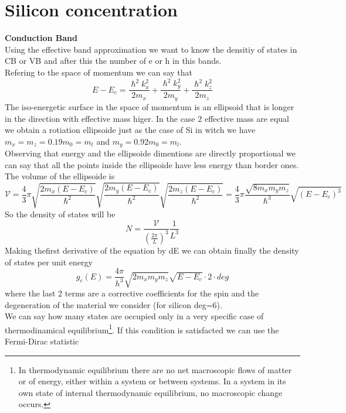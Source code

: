 \section{Silicon concentration}
{\bf Conduction Band}\\
Using the effective band approximation we want to know the densitiy of states in CB or VB and after this the number of e or h in this bands.\\
Refering to the space of momentum we can say that
\begin{equation}
E-E_c=\frac{\hslash^2 k_x^2}{2m_x}+\frac{\hslash^2 k_y^2}{2m_y}+\frac{\hslash^2 k_z^2}{2m_z}
\end{equation}
The iso-energetic surface in the space of momentum is an ellipsoid that is longer in the direction with effective mass higer. In the case 2 effective mass are equal we obtain a rotiation ellipsoide just as the case of Si in witch we have $m_x=m_z=0.19m_0=m_t$ and $m_y=0.92m_0=m_l$.\\
Observing that energy and the ellipsoide dimentions are directly proportional we can say that all the points inside the ellipsoide have less energy than border ones.\\
The volume of the ellipsoide is 
\begin{equation}
\mathcal{V}=\frac{4}{3}\pi \sqrt{\frac{2m_x(E-E_c)}{\hslash^2}}\sqrt{\frac{2m_y(E-E_c)}{\hslash^2}}\sqrt{\frac{2m_z(E-E_c)}{\hslash^2}}=\frac{4}{3}\pi\frac{\sqrt{8m_xm_ym_z}}{\hslash^3}\sqrt{(E-E_c)^3}
\end{equation}
So the density of states will be 
\begin{equation}
N=\frac{\mathcal{V}}{(\frac{2\pi}{L})^3}\frac{1}{L^3}
\end{equation}
Making thefirst derivative of the equation by dE we can obtain finally the density of states per unit energy
\begin{equation}
g_c(E)=\frac{4\pi}{h^3}\sqrt{2m_xm_ym_z}\sqrt{E-E_c}\cdot 2 \cdot deg
\end{equation}
where the last 2 terms are a corrective coefficients for the spin and the degeneration of the material we consider (for silicon deg=6).\\
We can say how many states are occupied only in a very specific case of thermodinamical equilibrium\footnote{In thermodynamic equilibrium there are no net macroscopic flows of matter or of energy, either within a system or between systems. In a system in its own state of internal thermodynamic equilibrium, no macroscopic change occurs.}. 
If this condition is satisfacted we can use the Fermi-Dirac statistic
